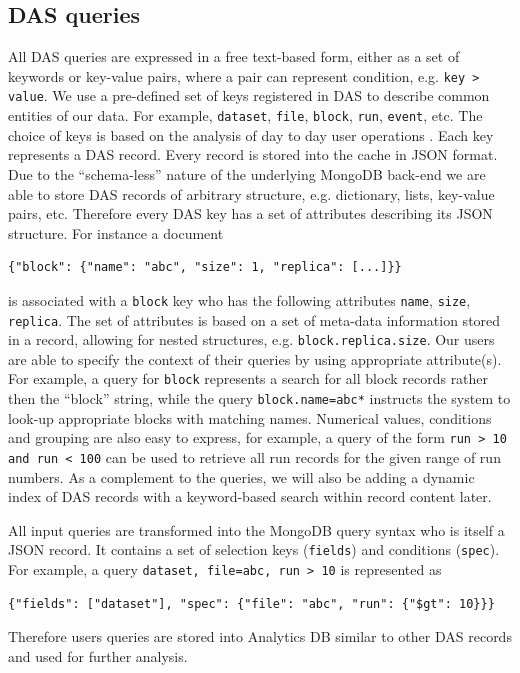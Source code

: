 \documentclass[1p,times]{elsarticle}
\begin{document}
\subsection{DAS queries}
All DAS queries are expressed in a free text-based form, either as a 
set of keywords or key-value pairs, where a pair can represent
condition, e.g. \verb+key > value+. We use a pre-defined set of keys registered 
in DAS to describe common entities of our data. For example, \verb+dataset+, 
\verb+file+, \verb+block+, \verb+run+, \verb+event+, etc. The choice of keys
is based on the analysis of day to day user operations \cite{DBS07}.
Each key represents a DAS record. Every record is stored into the cache
in JSON format. Due to the ``schema-less'' nature of the underlying MongoDB
back-end we are able to store DAS records of arbitrary structure, e.g.
dictionary, lists, key-value pairs, etc. Therefore every DAS key has a 
set of attributes describing its JSON structure. For instance a document
\begin{verbatim}
{"block": {"name": "abc", "size": 1, "replica": [...]}}
\end{verbatim}
is associated with a \verb+block+ key who has the following attributes
\verb+name+, \verb+size+, \verb+replica+. The set of attributes is based 
on a set of meta-data information stored in a record, allowing
for nested structures, e.g. \verb+block.replica.size+. Our users 
are able to specify the context of their queries by using appropriate 
attribute(s). For example, a query for \verb+block+ represents a search for all
block records rather then the ``block'' string, while the query
\verb+block.name=abc*+ instructs the system to look-up appropriate blocks
with matching names. Numerical values, conditions and grouping are
also easy to express, for example, a query
of the form \verb+run > 10 and run < 100+ can be used to
retrieve all run records for the given range of run numbers. 
As a complement to the queries, we will also be adding a dynamic index
of DAS records with a keyword-based search within record content later.

All input queries are transformed into the MongoDB query syntax who is itself
a JSON record. It contains a set of selection 
keys (\verb+fields+) and conditions (\verb+spec+). For example, a query
\verb+dataset, file=abc, run > 10+
is represented as
\begin{verbatim}
{"fields": ["dataset"], "spec": {"file": "abc", "run": {"$gt": 10}}}
\end{verbatim}
Therefore users queries are stored into Analytics DB similar to other DAS 
records and used for further analysis.
\end{document}

